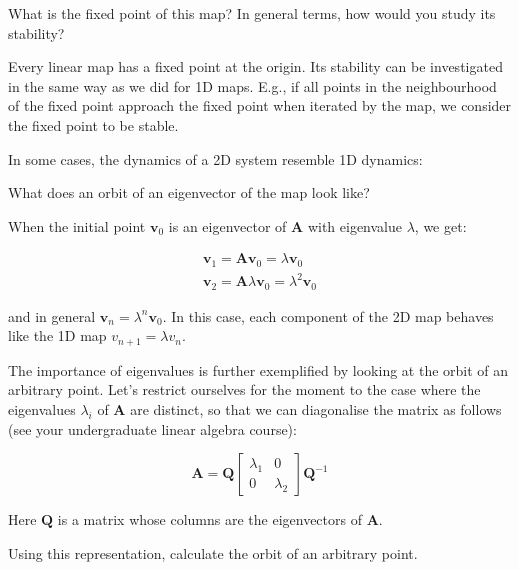 \begin{cue}
What is the fixed point of this map? In general terms, how would you study its stability? 
\end{cue}

Every linear map has a fixed point at the origin. Its stability can be investigated in the same way as we did for 1D maps. E.g., if all points in the neighbourhood of the fixed point approach the fixed point when iterated by the map, we consider the fixed point to be stable.

In some cases, the dynamics of a 2D system resemble 1D dynamics:

\begin{cue}
What does an orbit of an eigenvector of the map look like?  
\end{cue}

When the initial point ${\mathbf v_0}$ is an eigenvector of ${\mathbf A}$ with eigenvalue $\lambda$, we get:

\begin{gather}
{\mathbf v_1} = {\mathbf A}{\mathbf v_0} = \lambda {\mathbf v_0} \\
{\mathbf v_2} = {\mathbf A}\lambda {\mathbf v_0} = \lambda^2 {\mathbf v_0} 
\end{gather} 

and in general ${\mathbf v_n} = \lambda^n {\mathbf v_0}$. In this case, each component of the 2D map behaves like the 1D map $v_{n+1} = \lambda v_n$.

The importance of eigenvalues is further exemplified by looking at the orbit of an arbitrary point. Let's restrict ourselves for the moment to the case where the eigenvalues $\lambda_i$ of ${\mathbf A}$ are distinct, so that we can diagonalise the matrix as follows (see your undergraduate linear algebra course):

\begin{equation}
{\mathbf A} = {\mathbf Q}
\begin{bmatrix}
\lambda_{1} & 0 \\
0 & \lambda_{2}
\end{bmatrix} 
{\mathbf Q^{-1}}
\end{equation} 

Here $\mathbf Q$ is a matrix whose columns are the eigenvectors of ${\mathbf A}$. 

\begin{cue}
Using this representation, calculate the orbit of an arbitrary point.
\end{cue}

